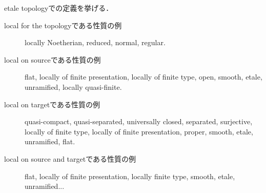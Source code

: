 \begin{Example}
    etale topologyでの定義を挙げる．
    \begin{description}
    \item[local for the topologyである性質の例] \mnewline
        locally Noetherian, reduced, normal, regular.

    \item[local on sourceである性質の例] \mnewline
        flat, locally of finite presentation, locally of finite type, open,
        smooth, etale, unramified, locally quasi-finite.

    \item[local on targetである性質の例] \mnewline
        quasi-compact, quasi-separated, universally closed, separated, surjective,
        locally of finite type, locally of finite presentation,
        proper, smooth, etale, unramified, flat.

    \item[local on source and targetである性質の例] \mnewline
        flat, locally of finite presentation, locally finite type,
        smooth, etale, unramified...
    \end{description}
\end{Example}

